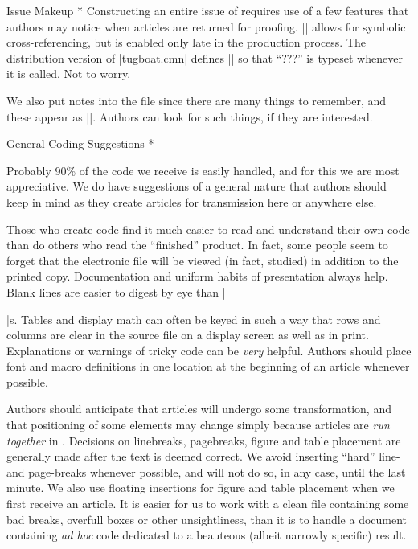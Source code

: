 \subhead * Issue Makeup *
Constructing an entire issue of \TUB\/ requires use of a few features
that authors may notice when articles are returned for proofing.
|\xrefto| allows for symbolic cross-referencing, but is enabled only
late in the production process.  The distribution version of
|tugboat.cmn| defines |\xrefto| so that ``???'' is typeset whenever it
is called.  Not to worry.

We also put notes into the file since there are many things to
remember, and these appear as ||.  Authors can look for
such things, if they are interested.


\head * General Coding Suggestions *

Probably 90\% of the code we receive is easily handled, and for this
we are most appreciative.  We do have suggestions of a general nature
that authors should keep in mind as they create articles for
transmission here or anywhere else.

Those who create code find it much easier to read and understand their
own code than do others who read the ``finished'' product.  In fact,
some people seem to forget that the electronic file will be viewed (in
fact, studied) in addition to the printed copy.  Documentation and
uniform habits of presentation always help.  Blank lines are easier to
digest by eye than |\par|s.  Tables and display math can often be
keyed in such a way that rows and columns are clear in the source file
on a display screen as well as in print.  Explanations or warnings of
tricky code can be {\it very} helpful.  Authors should place font and
macro definitions in one location at the beginning of an article
whenever possible.

Authors should anticipate that articles will undergo some
transformation, and that positioning of some elements may change
simply because articles are {\it run together\/} in \TUB.  Decisions
on linebreaks, pagebreaks, figure and table placement are generally
made after the text is deemed correct. We avoid inserting ``hard''
line- and page-breaks whenever possible, and will not do so, in any
case, until the last minute.  We also use floating insertions for
figure and table placement when we first receive an article.  It is
easier for us to work with a clean file containing some bad breaks,
overfull boxes or other unsightliness, than it is to handle a document
containing {\it ad hoc\/} code dedicated to a beauteous (albeit
narrowly specific) result.



